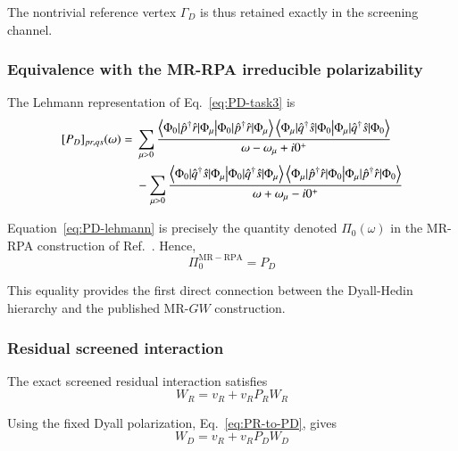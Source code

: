 \documentclass[aip,jcp,reprint,noshowkeys,superscriptaddress]{revtex4-1}
\begin{document}
The nontrivial reference vertex $\Gamma_D$ is thus retained exactly in
the screening channel.


\subsubsection{Equivalence with the MR-RPA irreducible polarizability}

The Lehmann representation of Eq.~\eqref{eq:PD-task3} is
\begin{equation}
  \begin{aligned}
  [P_D]_{pr,qs}(\omega)
  ={}&
  \sum_{\mu>0}
  \frac{
    \braket{
      \Phi_0
      |
      \hat p^\dagger\hat r
      |
      \Phi_\mu
    }
    \braket{
      \Phi_\mu
      |
      \hat q^\dagger\hat s
      |
      \Phi_0
    }
  }{
    \omega-\omega_\mu+i0^+
  }
  \\
  &-
  \sum_{\mu>0}
  \frac{
    \braket{
      \Phi_0
      |
      \hat q^\dagger\hat s
      |
      \Phi_\mu
    }
    \braket{
      \Phi_\mu
      |
      \hat p^\dagger\hat r
      |
      \Phi_0
    }
  }{
    \omega+\omega_\mu-i0^+
  }
  \end{aligned}
  \label{eq:PD-lehmann}
\end{equation}

Equation~\eqref{eq:PD-lehmann} is precisely the quantity denoted
$\Pi_0(\omega)$ in the MR-RPA construction of
Ref.~\cite{WangFangLi2026}.  Hence,
\begin{equation}
  \Pi_0^{\mathrm{MR-RPA}}
  =
  P_D
  \label{eq:Pi0-equals-PD}
\end{equation}

This equality provides the first direct connection between the
Dyall-Hedin hierarchy and the published MR-$GW$ construction.


\subsubsection{Residual screened interaction}

The exact screened residual interaction satisfies
\begin{equation}
  W_R
  =
  v_R
  +
  v_RP_RW_R
\end{equation}

Using the fixed Dyall polarization,
Eq.~\eqref{eq:PR-to-PD}, gives
\begin{equation}
  W_D
  =
  v_R
  +
  v_RP_DW_D
  \label{eq:WD-task3}
\end{equation}
\end{document}
